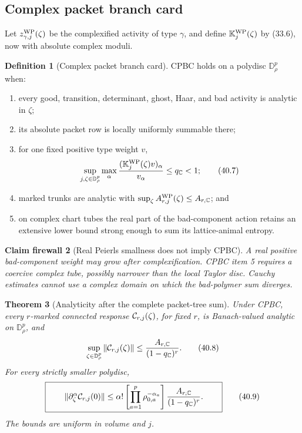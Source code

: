 \documentclass[11pt,oneside]{book}
\newtheorem{theorem}{Theorem}[chapter]
\newtheorem{firewall}[theorem]{Claim firewall}
\theoremstyle{definition}
\newtheorem{definition}[theorem]{Definition}
\theoremstyle{remark}
\begin{document}
\subsection{Complex packet branch card}

Let \(z_{\gamma,j}^{\rm WP}(\zeta)\) be the complexified activity of
type \(\gamma\), and define
\({\mathbb K}_j^{\rm WP}(\zeta)\) by (33.6), now with absolute
complex moduli.

\begin{definition}[Complex packet branch card]
\label{def:e8v40-CPBC}
CPBC holds on a polydisc \({\mathbb D}_\rho^p\) when:
\begin{enumerate}
\item every good, transition, determinant, ghost, Haar, and bad
      activity is analytic in \(\zeta\);
\item its absolute packet row is locally uniformly summable there;
\item for one fixed positive type weight \(v\),
\[
 \sup_{j,\zeta\in{\mathbb D}_\rho^p}
 \max_\alpha
 \frac{({\mathbb K}_j^{\rm WP}(\zeta)v)_\alpha}{v_\alpha}
 \leq q_{\mathbb C}<1;                                          \tag{40.7}
\]
\item marked trunks are analytic with
      \(\sup_{\zeta}A_{r,j}^{\rm WP}(\zeta)\leq A_{r,\mathbb C}\);
      and
\item on complex chart tubes the real part of the bad-component
      action retains an extensive lower bound strong enough to sum
      its lattice-animal entropy.
\end{enumerate}
\end{definition}

\begin{firewall}[Real Peierls smallness does not imply CPBC]
\label{fire:e8v40-complex-bad}
A real positive bad-component weight may grow after complexification.
CPBC item 5 requires a coercive complex tube, possibly narrower than
the local Taylor disc.  Cauchy estimates cannot use a complex domain
on which the bad-polymer sum diverges.
\end{firewall}

\begin{theorem}[Analyticity after the complete packet-tree sum]
\label{thm:e8v40-connected-analytic}
Under CPBC, every \(r\)-marked connected response
\({\cal C}_{r,j}(\zeta)\), for fixed \(r\), is Banach-valued analytic
on \({\mathbb D}_\rho^p\), and
\[
 \sup_{\zeta\in{\mathbb D}_\rho^p}
 \|{\cal C}_{r,j}(\zeta)\|
 \leq
 \frac{A_{r,\mathbb C}}{(1-q_{\mathbb C})^r}.                    \tag{40.8}
\]
For every strictly smaller polydisc,
\[
\boxed{\qquad
 \|\partial_\zeta^\alpha{\cal C}_{r,j}(0)\|
 \leq
 \alpha!\left[
 \prod_{a=1}^p\rho_{0,a}^{-\alpha_a}
 \right]
 \frac{A_{r,\mathbb C}}{(1-q_{\mathbb C})^r}.
\qquad}                                                         \tag{40.9}
\]
The bounds are uniform in volume and \(j\).
\end{theorem}
\end{document}
